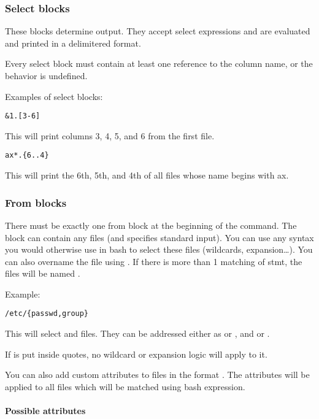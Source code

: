 \subsubsection{Select blocks}
These blocks determine output. They accept select expressions and are evaluated and printed in a delimitered format.

Every select block must contain at least one reference to the column name, or the behavior is undefined.

Examples of select blocks:
\begin{verbatim}
&1.[3-6]
\end{verbatim}
This will print columns 3, 4, 5, and 6 from the first file.

\begin{verbatim}
ax*.{6..4}
\end{verbatim}
This will print the 6th, 5th, and 4th of all files whose name begins with ax.

\subsubsection{From blocks}
There must be exactly one from block at the beginning of the command. 
The block can contain any files (and \icode{-} specifies standard input). 
You can use any syntax you would otherwise use in bash to select these files (wildcards, expansion\ldots{})\break \cite{bash-reference-manual}. 
You can also overname the file using . If there is more than 1 matching of stmt, the files will be named .

Example:
\begin{verbatim}
/etc/{passwd,group}
\end{verbatim}

This will select  and  files. They can be addressed either as  or , and  or .

If  is put inside  quotes, no wildcard or expansion logic will apply to it.

You can also add custom attributes to files in the format \break {}. The attributes will be applied to all files which will be matched using  bash expression.

\paragraph{Possible attributes}

